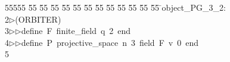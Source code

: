 %
%
\begin{tabbing}
55555 \= 55 \= 55 \= 55 \= 55 \= 55 \= 55 \= 55 \= 55 \= 55 \= 55 \= 55 \= 55 \= \>object\_PG\_3\_2:\\[0pt]
2\>$\triangleright$\>(ORBITER)\ \\[0pt]
3\>$\triangleright$\>$\triangleright$\>define\ F\ finite\_field\ q\ 2\ end\ \\[0pt]
4\>$\triangleright$\>$\triangleright$\>define\ P\ projective\_space\ n\ 3\ field\ F\ v\ 0\ end\ \\[0pt]
5\>\end{tabbing}
